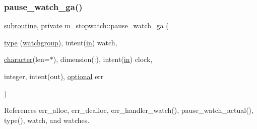 \subsubsection{\texorpdfstring{pause\+\_\+watch\+\_\+ga()}{pause\_watch\_ga()}}
{\footnotesize\ttfamily \hyperlink{M__stopwatch_83_8txt_acfbcff50169d691ff02d4a123ed70482}{subroutine}, private m\+\_\+stopwatch\+::pause\+\_\+watch\+\_\+ga (\begin{DoxyParamCaption}\item[{\hyperlink{stop__watch_83_8txt_a70f0ead91c32e25323c03265aa302c1c}{type} (\hyperlink{structm__stopwatch_1_1watchgroup}{watchgroup}), intent(\hyperlink{M__journal_83_8txt_afce72651d1eed785a2132bee863b2f38}{in})}]{watch,  }\item[{\hyperlink{option__stopwatch_83_8txt_abd4b21fbbd175834027b5224bfe97e66}{character}(len=$\ast$), dimension(\+:), intent(\hyperlink{M__journal_83_8txt_afce72651d1eed785a2132bee863b2f38}{in})}]{clock,  }\item[{integer, intent(out), \hyperlink{option__stopwatch_83_8txt_aa4ece75e7acf58a4843f70fe18c3ade5}{optional}}]{err }\end{DoxyParamCaption})\hspace{0.3cm}{\ttfamily [private]}}



References err\+\_\+alloc, err\+\_\+dealloc, err\+\_\+handler\+\_\+watch(), pause\+\_\+watch\+\_\+actual(), type(), watch, and watches.

